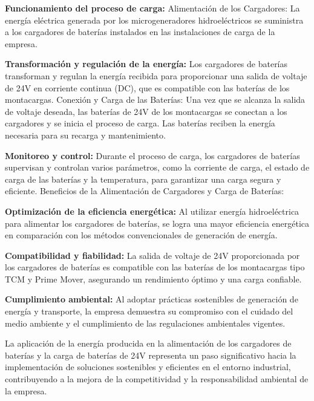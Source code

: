 \documentclass[11pt]{article}
\begin{document}
            \textbf{Funcionamiento del proceso de carga:}
            Alimentación de los Cargadores: La energía eléctrica generada por los microgeneradores
            hidroeléctricos se suministra a los cargadores de baterías instalados en las instalaciones de
            carga de la empresa.

            \textbf{Transformación y regulación de la energía:} Los cargadores de baterías transforman y
            regulan la energía recibida para proporcionar una salida de voltaje de 24V en corriente
            continua (DC), que es compatible con las baterías de los montacargas.
            Conexión y Carga de las Baterías: Una vez que se alcanza la salida de voltaje deseada, las
            baterías de 24V de los montacargas se conectan a los cargadores y se inicia el proceso de
            carga. Las baterías reciben la energía necesaria para su recarga y mantenimiento.
            
            \textbf{Monitoreo y control: }Durante el proceso de carga, los cargadores de baterías supervisan y
            controlan varios parámetros, como la corriente de carga, el estado de carga de las baterías
            y la temperatura, para garantizar una carga segura y eficiente.
            Beneficios de la Alimentación de Cargadores y Carga de Baterías:
            
            \textbf{Optimización de la eficiencia energética: }Al utilizar energía hidroeléctrica para alimentar los
            cargadores de baterías, se logra una mayor eficiencia energética en comparación con los
            métodos convencionales de generación de energía.
           
           \textbf{Compatibilidad y fiabilidad:} La salida de voltaje de 24V proporcionada por los cargadores
            de baterías es compatible con las baterías de los montacargas tipo TCM y Prime Mover,
            asegurando un rendimiento óptimo y una carga confiable.

            \textbf{Cumplimiento ambiental:} Al adoptar prácticas sostenibles de generación de energía y
            transporte, la empresa demuestra su compromiso con el cuidado del medio ambiente y el
            cumplimiento de las regulaciones ambientales vigentes.

            La aplicación de la energía producida en la alimentación de los cargadores de baterías y la
            carga de baterías de 24V representa un paso significativo hacia la implementación de
            soluciones sostenibles y eficientes en el entorno industrial, contribuyendo a la mejora de la
            competitividad y la responsabilidad ambiental de la empresa.
\end{document}
